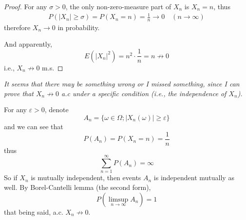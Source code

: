 \begin{subproblem}
        \item
        \begin{proof}
            For any $\sigma>0$, the only non-zero-measure part
            of $X_n$ is $X_n=n$, thus
            \[\begin{aligned}
                P(|X_n|\geq\sigma)=P(X_n=n)=\frac{1}{n}\to 0
                \quad(n\to\infty)
            \end{aligned}\]
            therefore $X_n\to 0$ in probability.

            And apparently,
            \[E(|X_n|^2)=n^2\cdot\frac{1}{n}=n\not\to 0\]
            i.e., $X_n\not\to 0$ m.s.
        \end{proof}

        \item
        {
            \it
            It seems that there may be something wrong or I missed something,
            since I can
            prove that $X_n\not\to 0$ a.c under a specific condition
            (i.e., the independence of $X_n$).

            For any $\varepsilon>0$, denote
            \[A_n=\{\omega\in\Omega;|X_n(\omega)|\geq\varepsilon\}\]
            and we can see that
            \[P(A_n)=P(X_n=n)=\frac{1}{n}\]
            thus
            \[\sum_{n=1}^\infty P(A_n)=\infty\]
            So if $X_n$ is mutually independent, then events $A_n$
            is independent mutually as well. By Borel-Cantelli lemma
            (the second form), 
            \[P\left(\limsup_{n\to\infty}A_n\right)=1\]
            that being said, a.c. $X_n\not\to 0$.
        }



\end{subproblem}
